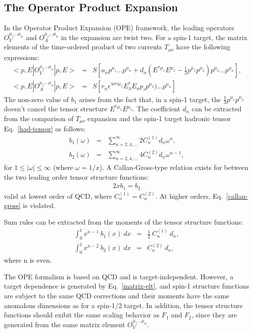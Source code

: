 \subsection{The Operator Product Expansion}
%
In the Operator Product Expansion (OPE) framework, the leading operators 
$O_V^{\mu_1...\mu_n}$ and $O_A^{\mu_1...\mu_n}$ in the expansion are twist two. For a 
spin-1 target, the matrix elements of the time-ordered product of two currents 
$T_{\mu\nu}$ have the following expressions:
%
\begin{eqnarray}
<p,E|O_V^{\mu_1...\mu_n}|p,E>&=&S[a_np^{\mu_1}...p^{\mu_n}+d_n(E^{*\mu_1}E^{\mu_2}-\frac{1}{3}p^{\mu_1}
p^{\mu_2})p^{\mu_3}...p^{\mu_n}], \nonumber \\
<p,E|O_A^{\mu_1...\mu_n}|p,E>&=&S[r_n\epsilon^{\lambda\sigma\tau\mu_1}E_{\lambda}^*E_{\sigma}p_{\tau}
p^{\mu_2})...p^{\mu_n}]
\label{matrix-elt}
\end{eqnarray}
%
The non-zero value of $b_1$ arises from the fact that, in a spin-1 target, the 
$\frac{1}{3}p^{\mu_1}p^{\mu_2}$ doesn't cancel the tensor structure $E^{*\mu_1}E^{\mu_2}$. 
The coefficient $d_n$ can be extracted from the comparison of $T_{\mu\nu}$ expansion 
and the spin-1 target hadronic tensor Eq.~\ref{had-tensor} as follows:
%
\begin{eqnarray}
b_1(\omega)&=&\sum_{n=2,4,...}^\infty 2 C_n^{(1)} d_n \omega^n, \nonumber \\
b_2(\omega)&=&\sum_{n=2,4,...}^\infty 4 C_n^{(2)} d_n \omega^{n-1},
\end{eqnarray}
%
for $1 \le |\omega| \le \infty$ (where $\omega = 1/x$). A Callan-Gross-type relation 
exists for between the two leading order tensor structure functions:
%
\begin{eqnarray}
 2 x b_1 = b_2
\label{callan-gross}
\end{eqnarray}
%
valid at lowest order of QCD, where $C_n^{(1)} = C_n^{(2)}$.
At higher orders, Eq.~\ref{callan-gross} is violated.

Sum rules can be 
extracted from the moments of the tensor structure functions:
%
\begin{eqnarray}
\int_0^1 x^{n-1}~b_1(x)~dx &=& \frac{1}{2}~C_n^{(1)}~d_n, \nonumber \\
\int_0^1 x^{n-2}~b_2(x)~dx &=& C_n^{(2)}~d_n,
\label{sr}
\end{eqnarray}
%
where n is even. 

The OPE formalism is based on QCD and is target-independent. However, a target dependence 
is generated by Eq.~\ref{matrix-elt}, and spin-1 structure functions are subject to 
the same QCD corrections and their moments have the same anomalous dimensions as for 
a spin-1/2 target. In addition, the tensor structure functions should exibit the same 
scaling behavior as $F_1$ and $F_2$, since they are generated from the same matrix 
element $O_V^{\mu_1...\mu_n}$.
